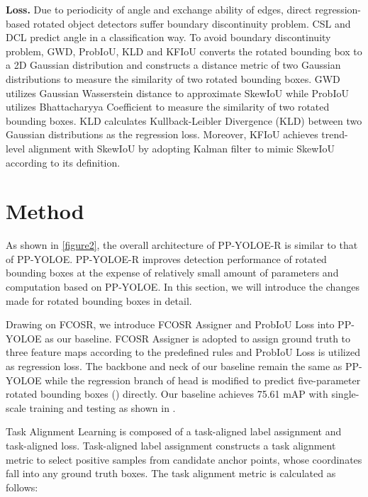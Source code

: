 \documentclass[final]{cvpr}
\begin{document}
{\bf Loss.} Due to periodicity of angle and exchange ability of edges, direct regression-based rotated object detectors suffer boundary discontinuity problem. CSL\cite{yang2020arbitrary} and DCL\cite{yang2021dense} predict angle in a classification way. To avoid boundary discontinuity problem, GWD\cite{yang2021rethinking}, ProbIoU\cite{llerena2021gaussian}, KLD\cite{yang2021learning} and KFIoU\cite{yang2022kfiou} converts the rotated bounding box to a 2D Gaussian distribution and constructs a distance metric of two Gaussian distributions to measure the similarity of two rotated bounding boxes. GWD\cite{yang2021rethinking} utilizes Gaussian Wasserstein distance to  approximate SkewIoU while ProbIoU\cite{llerena2021gaussian} utilizes Bhattacharyya Coefficient to measure the similarity of two rotated bounding boxes. KLD\cite{yang2021learning} calculates Kullback-Leibler Divergence (KLD) between two Gaussian distributions as the regression loss. Moreover, KFIoU\cite{yang2022kfiou} achieves trend-level alignment with SkewIoU by adopting Kalman filter to mimic SkewIoU according to its definition. 


\section{Method}
As shown in \cref{figure2}, the overall architecture of PP-YOLOE-R is similar to that of PP-YOLOE. PP-YOLOE-R improves detection performance of rotated bounding boxes at the expense of relatively small amount of parameters and computation based on PP-YOLOE. In this section, we will introduce the changes made for rotated bounding boxes in detail.

 Drawing on FCOSR\cite{li2021fcosr}, we introduce FCOSR Assigner and ProbIoU Loss into PP-YOLOE as our baseline. FCOSR Assigner is adopted to assign ground truth to three feature maps according to the predefined rules and ProbIoU Loss is utilized as regression loss. The backbone and neck of our baseline remain the same as PP-YOLOE while the regression branch of head is modified to predict five-parameter rotated bounding boxes () directly. Our baseline achieves 75.61 mAP with single-scale training and testing as shown in .

 Task Alignment Learning\cite{feng2021tood} is composed of a task-aligned label assignment and task-aligned loss. Task-aligned label assignment constructs a task alignment metric to select positive samples from candidate anchor points, whose coordinates fall into any ground truth boxes. The task alignment metric is calculated as follows:
\end{document}
